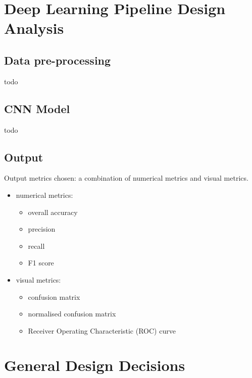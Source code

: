 \section{Deep Learning Pipeline Design Analysis}

\subsection{Data pre-processing}

todo

\subsection{CNN Model}

todo

\subsection{Output}

Output metrics chosen: a combination of numerical metrics and visual metrics.

\begin{itemize}
    \item numerical metrics:
    \begin{itemize}
        \item overall accuracy
        \item precision
        \item recall
        \item F1 score
    \end{itemize}
    \item visual metrics:
    \begin{itemize}
        \item confusion matrix
        \item normalised confusion matrix
        \item Receiver Operating Characteristic (ROC) curve
    \end{itemize}
\end{itemize}



\section{General Design Decisions}

